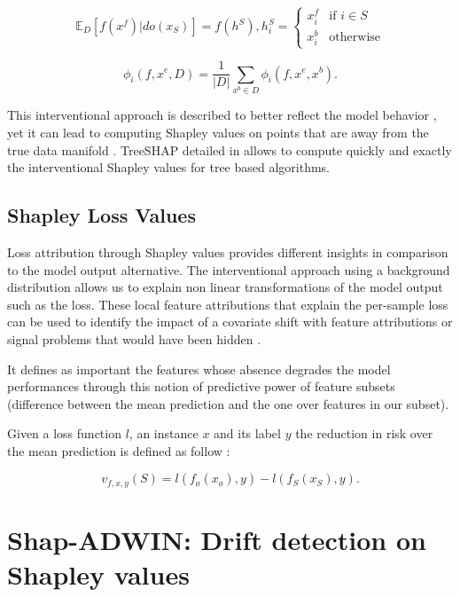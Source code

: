 \documentclass[runningheads]{llncs}
\begin{document}
    \begin{equation}
    \mathbb{E}_D[f(x^f)|do(x_S)] = f(h^S),       
    h^S_i =\begin{cases}
    x_i^f &\text{if $i \in S$}\\
    x_i^b &\text{otherwise}
    \end{cases}
    \end{equation}
    
    
    \begin{equation}
        \phi_i(f,x^e,D) =  \frac{1}{|D|}\sum_{x^b \in D}\phi_i(f,x^e,x^b).
    \end{equation}

    This interventional approach is described to better reflect the model behavior \cite{chen_true_2020}, yet it can lead to computing Shapley values on points that are away from the true data manifold \cite{frye2020asymmetric}. TreeSHAP detailed in \cite{lundberg2020local2global} allows to compute quickly and exactly the interventional Shapley values for tree based algorithms. 
    
    
\subsection{Shapley Loss Values}
    Loss attribution through Shapley values provides different insights in comparison to the model output alternative. The interventional approach using a background distribution allows us to explain non linear transformations of the model output such as the loss.
    These local feature attributions that explain the per-sample loss
    can be used to identify the impact of a covariate shift with feature attributions \cite{Chen_attributions} or signal problems that would have been hidden \cite{lundberg2020local2global}.
    
    It defines as important the features whose absence degrades the model performances through this notion of predictive power of feature subsets (difference between the mean prediction and the one over features in our subset).

    Given a loss function $l$, an instance $x$ and its label $y$ the reduction in risk over the mean prediction is defined as follow \cite{SAGE_covert}:

\begin{equation}
    v_{f,x,y}(S) = l(f_{\text{\o}}(x_{\text{\o}}),y) - l(f_{S}(x_{S}),y).
\end{equation}


\section{Shap-ADWIN: Drift detection on Shapley values}\label{Detect Shap Vals}
\end{document}

